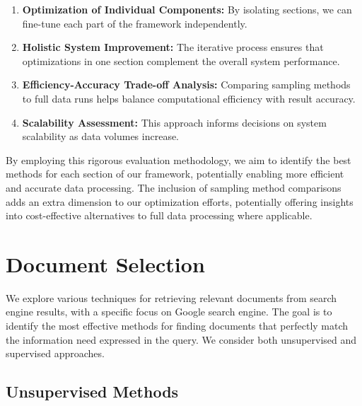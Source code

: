 \begin{enumerate}
    \item \textbf{Optimization of Individual Components:} By isolating sections, we can fine-tune each part of the framework independently.
    \item \textbf{Holistic System Improvement:} The iterative process ensures that optimizations in one section complement the overall system performance.
    \item \textbf{Efficiency-Accuracy Trade-off Analysis:} Comparing sampling methods to full data runs helps balance computational efficiency with result accuracy.
    \item \textbf{Scalability Assessment:} This approach informs decisions on system scalability as data volumes increase.
\end{enumerate}

By employing this rigorous evaluation methodology, we aim to identify the best methods for each section of our framework, potentially enabling more efficient and accurate data processing.
The inclusion of sampling method comparisons adds an extra dimension to our optimization efforts, potentially offering insights into cost-effective alternatives to full data processing where applicable.

\section{Document Selection}\label{sec:document-selection}
We explore various techniques for retrieving relevant documents from search engine results, with a specific focus on Google search engine.
The goal is to identify the most effective methods for finding documents that perfectly match the information need expressed in the query.
We consider both unsupervised and supervised approaches.
\subsection{Unsupervised Methods}\label{subsec:unsupervised-methods}

